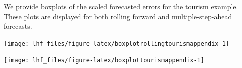 \documentclass[11pt,a4paper,]{article}
\let\origfigure\figure
\let\endorigfigure\endfigure
\renewenvironment{figure}[1][2] {
    \expandafter\origfigure\expandafter[!htbp]
} {
    \endorigfigure
}
\begin{document}
We provide boxplots of the scaled forecasted errors for the tourism
example. These plots are displayed for both rolling forward and
multiple-step-ahead forecasts.

\begin{figure}

{\centering \texttt{[image: lhf\_files/figure-latex/boxplotrollingtourismappendix-1]} 

}

\caption{Box plots of scaled forecast errors from reconciled and unreconciled ETS, ARIMA and OLS methods at each hierarchical level for rolling origin 24-step-ahead tourism demand.}\label{fig:boxplotrollingtourismappendix}
\end{figure}

\begin{figure}

{\centering \texttt{[image: lhf\_files/figure-latex/boxplottourismappendix-1]} 

}

\caption{Box plots of scaled forecast errors from reconciled and unreconciled ETS, ARIMA and OLS methods at each hierarchical level for fixed origin 24-step-ahead tourism demand.}\label{fig:boxplottourismappendix}
\end{figure}
\clearpage

\printbibliography
\end{document}
